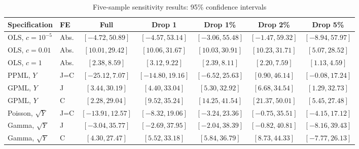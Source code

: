 \begin{table}[p]
\centering
\begin{singlespace}
\normalsize
\caption{Five-sample sensitivity results: 95\% confidence intervals}
\label{table:application-full-intervals}
\setlength{\tabcolsep}{1pt}
\begin{tabular*}{\textwidth}{@{\extracolsep{\fill}}llccccc@{}}
\toprule
Specification & FE & Full & Drop 1 & Drop 1\% & Drop 2\% & Drop 5\% \\
\midrule
OLS, \(c=10^{-5}\) & Abs. & \([-4.72, 50.89]\) & \([-4.57, 53.14]\) & \([-3.06, 55.48]\) & \([-1.47, 59.32]\) & \([-8.94, 57.97]\) \\
OLS, \(c=0.01\) & Abs. & \([10.01, 29.42]\) & \([10.06, 31.67]\) & \([10.03, 30.91]\) & \([10.23, 31.71]\) & \([5.07, 28.52]\) \\
OLS, \(c=1\) & Abs. & \([2.38, 8.59]\) & \([3.12, 9.22]\) & \([2.39, 8.11]\) & \([2.20, 7.59]\) & \([1.13, 4.59]\) \\
PPML, \(Y\) & J=C & \([-25.12, 7.07]\) & \([-14.80, 19.16]\) & \([-6.52, 25.63]\) & \([0.90, 46.14]\) & \([-0.08, 17.24]\) \\
GPML, \(Y\) & J & \([3.44, 30.19]\) & \([4.40, 33.04]\) & \([5.30, 32.92]\) & \([6.68, 34.54]\) & \([1.29, 32.73]\) \\
GPML, \(Y\) & C & \([2.28, 29.04]\) & \([9.52, 35.24]\) & \([14.25, 41.54]\) & \([21.37, 50.01]\) & \([5.45, 27.48]\) \\
Poisson, \(\sqrt{Y}\) & J=C & \([-13.91, 12.57]\) & \([-8.32, 19.06]\) & \([-3.24, 23.36]\) & \([-0.75, 35.51]\) & \([-4.15, 17.12]\) \\
Gamma, \(\sqrt{Y}\) & J & \([-3.04, 35.77]\) & \([-2.69, 37.95]\) & \([-2.04, 38.39]\) & \([-0.82, 40.81]\) & \([-8.16, 39.43]\) \\
Gamma, \(\sqrt{Y}\) & C & \([4.30, 27.47]\) & \([5.52, 33.18]\) & \([5.84, 36.79]\) & \([8.73, 44.33]\) & \([-7.77, 26.13]\) \\
\bottomrule
\end{tabular*}
\par\smallskip
\begin{minipage}{\textwidth}
\end{minipage}
\end{singlespace}
\end{table}
